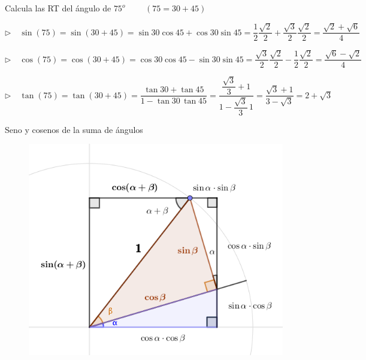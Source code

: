 \vspace{5mm}

\begin{miejemplo}

Calcula las RT del ángulo de $75^o$ \textcolor{gris}{$\qquad (75=30+45)$}

\vspace{4mm}
$\triangleright \quad \sin(75)=\sin(30+45)=\sin 30 \cos 45 + \cos 30 \sin 45= \dfrac 1 2 \dfrac{\sqrt{2}}{2}+\dfrac{\sqrt{3}}{2} \dfrac{\sqrt{2}}{2} = \dfrac{\sqrt{2}+\sqrt{6}}{4}$

\vspace{4mm}
$\triangleright \quad \cos(75)=\cos(30+45)=\cos 30 \cos 45 - \sin 30 \sin 45=\dfrac{\sqrt{3}}{2}\dfrac{\sqrt{2}}{2}-\dfrac 12 \dfrac{\sqrt{2}}{2}=\dfrac{\sqrt{6}-\sqrt{2}}{4}$

\vspace{4mm}
$\triangleright \quad \tan(75)=\tan(30+45)=\dfrac{\tan 30+\tan 45}{1-\tan 30\, \tan 45}=\dfrac{\dfrac{\sqrt{3}}{3}+1}{1-\dfrac{\sqrt{3}}{3}\, 1}=\dfrac{\sqrt{3}+1}{3-\sqrt{3}}=2+\sqrt{3}$

	
\end{miejemplo}




\vspace{5mm}
\begin{myalertblock}{Seno y cosenos de la suma de ángulos}
	\begin{figure}[H]
	\centering
	\includegraphics[width=.9\textwidth]{img-ft/ft01notransp.png}
	\end{figure}
	\vspace{2mm}
\end{myalertblock}



